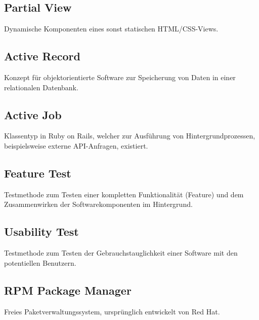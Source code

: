 \subsection*{Partial View}
Dynamische Komponenten eines sonst statischen HTML/CSS-Views.
\subsection*{Active Record}
Konzept für objektorientierte Software zur Speicherung von Daten in einer relationalen
Datenbank.
\subsection*{Active Job}
Klassentyp in Ruby on Rails, welcher zur Ausführung von Hintergrundprozessen, beispielsweise
externe API-Anfragen, existiert.
\subsection*{Feature Test}
Testmethode zum Testen einer kompletten Funktionalität (Feature) und dem Zusammenwirken der
Softwarekomponenten im Hintergrund.
\subsection*{Usability Test}
Testmethode zum Testen der Gebrauchstauglichkeit einer Software mit den potentiellen Benutzern.
\subsection*{RPM Package Manager}
Freies Paketverwaltungssystem, ursprünglich entwickelt von Red Hat.
